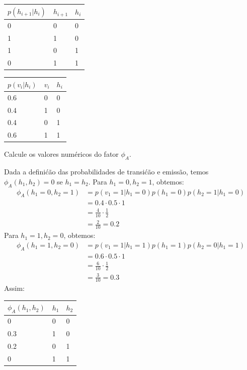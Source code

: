 \begin{exenumerate}
    \begin{center}
        \begin{tabular}{lll}
            \toprule
            $p(h_{i+1}|h_i)$ & $h_{i+1}$ &$h_i$ \\
            \midrule
            0 & 0 & 0\\
            1 & 1 & 0\\
            1 & 0 & 1\\
            0 & 1 & 1\\
            \bottomrule
        \end{tabular}
        \hspace{5ex}
        \begin{tabular}{lll}
            \toprule
            $p(v_i|h_i)$ & $v_i$ &$h_i$ \\
            \midrule
            0.6 & 0 & 0\\
            0.4 & 1 & 0\\
            0.4 & 0 & 1\\
            0.6 & 1 & 1\\
            \bottomrule
        \end{tabular}
    \end{center}
    Calcule os valores num\'ericos do fator $\phi_A$.
    
    \begin{solution}
        Dada a defini\'c\~ao das probabilidades de transi\'c\~ao e emiss\~ao, temos $\phi_A(h_1,h_2) = 0$ se $h_1=h_2$. Para $h_1=0, h_2 =1$, obtemos:
        \begin{align}
            \phi_A(h_1=0, h_2=1) &= p(v_1=1 | h_1=0) p(h_1=0) p(h_2=1 | h_1=0) \\
            & = 0.4 \cdot 0.5 \cdot 1\\
            & = \frac{4}{10} \cdot \frac{1}{2}\\
            & = \frac{2}{10} = 0.2
        \end{align}
        Para $h_1=1, h_2 =0$, obtemos:
        \begin{align}
            \phi_A(h_1=1, h_2=0) &= p(v_1=1 | h_1=1) p(h_1=1) p(h_2=0 | h_1=1) \\
            & = 0.6 \cdot 0.5 \cdot 1\\
            & = \frac{6}{10} \cdot \frac{1}{2}\\
            & = \frac{3}{10} = 0.3
        \end{align}
        Assim:
        \begin{center}
            \begin{tabular}{lll}
                \toprule
                $\phi_A(h_1, h_2)$ & $h_1$ &$h_2$ \\
                \midrule
                0 & 0 & 0\\
                0.3 & 1 & 0\\
                0.2 & 0 & 1\\
                0 & 1 & 1\\
                \bottomrule
            \end{tabular}
        \end{center}
    \end{solution}
    

\end{exenumerate}
